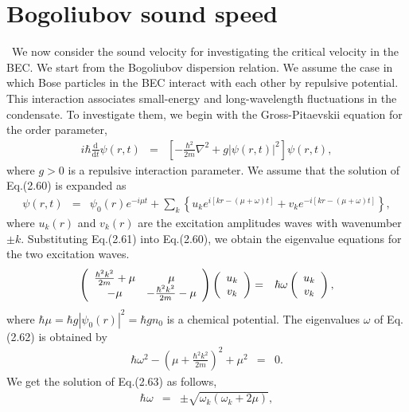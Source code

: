 \documentclass[12pt,a4paper]{report}
\newcommand{\diff}{\mathrm{d}}				            %
\begin{document}
\section{Bogoliubov sound speed}
\ We now consider the sound velocity for investigating the critical velocity in the BEC.
We start from the Bogoliubov dispersion relation.
We assume the case in which Bose particles in the BEC interact with each other by repulsive potential.
This interaction associates small-energy and long-wavelength fluctuations in the condensate.
To investigate them, we begin with the Gross-Pitaevskii equation for the order parameter,
\begin{eqnarray}
i \hbar \frac{\diff}{\diff t} \psi(r,t) & = & \left[ - \frac{\hbar^2}{2m} \nabla^2 + g | \psi(r,t) |^2 \right] \psi(r,t),
\end{eqnarray}
where $g>0$ is a repulsive interaction parameter.
We assume that the solution of Eq.(2.60) is expanded as
\begin{eqnarray}
\psi(r,t) & = & \psi_0(r)e^{-i \mu t} + 
\sum_k \left\{
u_k e^{i[kr - (\mu + \omega)t]} + v_k e^{-i[kr - (\mu + \omega)t]}
\right\},
\end{eqnarray}
where $u_k(r)$ and $v_k(r)$
are the excitation amplitudes
waves with wavenumber $\pm k$. Substituting Eq.(2.61) into Eq.(2.60), 
we obtain the eigenvalue equations for the two excitation waves.
\begin{eqnarray}
\left(
\begin{array}{c c}
\frac{\hbar^2 k^2}{2m} + \mu & \mu
\\
-\mu & -\frac{\hbar^2 k^2}{2m} - \mu
\end{array}
\right)
\left(
\begin{array}{c}
u_k
\\
v_k
\end{array}
\right)
& = & 
\hbar \omega
\left(
\begin{array}{c}
u_k
\\
v_k
\end{array}
\right),
\end{eqnarray}
where $\hbar \mu = \hbar g|\psi_0(r)|^2 = \hbar gn_0$ is a chemical potential.
The eigenvalues $\omega$ of Eq.(2.62) is obtained by
\begin{eqnarray}
\hbar \omega^2 - \left(
\mu + \frac{\hbar^2 k^2}{2m}
\right)^2
+ \mu^2 & = & 0.
\end{eqnarray}
We get the solution of Eq.(2.63) as follows,
\begin{eqnarray}
\hbar \omega & = & \pm \sqrt{\omega_k (\omega_k + 2\mu)},
\end{eqnarray}
\end{document}
